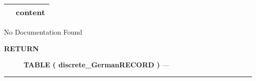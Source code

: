 {\renewcommand{\arraystretch}{1.5}
\begin{tabularx}{\textwidth}{|>{\raggedright\arraybackslash}l|X|}
\hline
\hspace{0pt}\mytexttt{\color{red} } & \textbf{content} \\
\hline
\end{tabularx}
}

\par





No Documentation Found








\par
\begin{description}
\item [\colorbox{tagtype}{\color{white} \textbf{\textsf{RETURN}}}] \textbf{TABLE ( discrete\_GermanRECORD )} --- 
\end{description}




\rule{\linewidth}{0.5pt}


